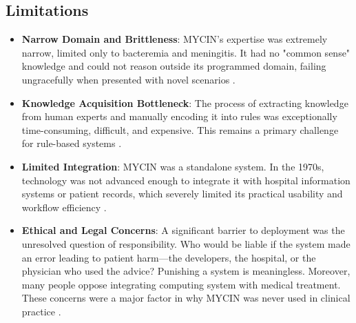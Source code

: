 \documentclass[conference]{IEEEtran}
\begin{document}
\subsection{Limitations}
\begin{itemize}
    \item \textbf{Narrow Domain and Brittleness}: MYCIN's expertise was extremely narrow, limited only to bacteremia and meningitis. It had no "common sense" knowledge and could not reason outside its programmed domain, failing ungracefully when presented with novel scenarios \cite{b29}.
    \item \textbf{Knowledge Acquisition Bottleneck}: The process of extracting knowledge from human experts and manually encoding it into rules was exceptionally time-consuming, difficult, and expensive. This remains a primary challenge for rule-based systems \cite{b30}.
    \item \textbf{Limited Integration}: MYCIN was a standalone system. In the 1970s, technology was not advanced enough to integrate it with hospital information systems or patient records, which severely limited its practical usability and workflow efficiency \cite{b14}.
    \item \textbf{Ethical and Legal Concerns}: A significant barrier to deployment was the unresolved question of responsibility. Who would be liable if the system made an error leading to patient harm—the developers, the hospital, or the physician who used the advice? Punishing a system is meaningless. Moreover, many people oppose integrating computing system with medical treatment. These concerns were a major factor in why MYCIN was never used in clinical practice \cite{b15}.
\end{itemize}
\end{document}
